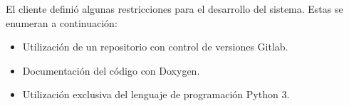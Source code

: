 El cliente definió algunas restricciones para el desarrollo del sistema.
Estas se enumeran a continuación:

\begin{itemize}
	\item Utilización de un repositorio con control de versiones Gitlab.
	\item Documentación del código con Doxygen.
	\item Utilización exclusiva del lenguaje de programación Python 3.
\end{itemize}

